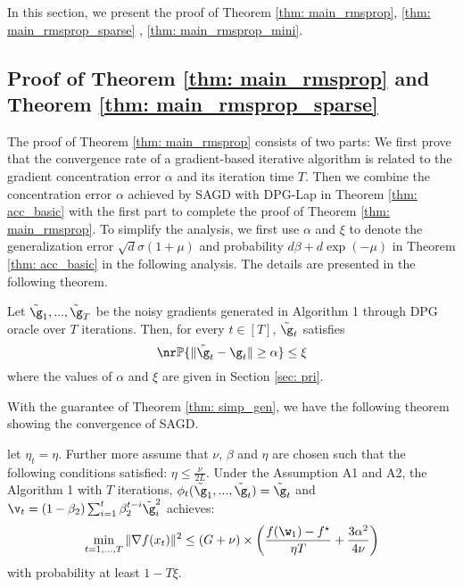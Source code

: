 
In this section, we present the proof of Theorem \ref{thm: main_rmsprop}, \ref{thm: main_rmsprop_sparse}
\label{sec: thm2_proof}, \ref{thm: main_rmsprop_mini}.

\subsection{Proof of Theorem \ref{thm: main_rmsprop} and Theorem \ref{thm: main_rmsprop_sparse}}

\theomainrmsprop*

The proof of Theorem \ref{thm: main_rmsprop} consists of two parts: We first prove that the convergence rate of a gradient-based iterative algorithm is related to the gradient concentration error $\alpha$ and its iteration 
time $T$. Then we combine the concentration error $\alpha$ achieved by SAGD with DPG-Lap in Theorem \ref{thm: acc_basic} with the first part to complete the proof of Theorem \ref{thm: main_rmsprop}. 
To simplify the analysis, we first use $\alpha$ and $\xi$ to denote the generalization error $\sqrt{d} \sigma(1+\mu)$ and probability $d \beta+d \exp (-\mu)$ in Theorem \ref{thm: acc_basic} in the following analysis. The details are presented in the following theorem.
\begin{theo} \label{thm: simp_gen}
Let $\tilde \g_1,...,\tilde \g_T$ be the noisy gradients generated in Algorithm 1 through DPG oracle over $T$ iterations.
Then, for every $t \in [T]$, $\tilde \g_t$ satisfies
\begin{equation} \nr
    \mathbb{P}\{\|\tilde \g_t - \g_t\| \geq \alpha \} \leq \xi
\end{equation}
where the values of $\alpha$ and $\xi$ are given in Section \ref{sec: pri}. 
\end{theo}
With the guarantee of Theorem \ref{thm: simp_gen}, we have the following theorem showing the convergence of SAGD.
\begin{theo} \label{thm: opt_rmsprop}
 let $\eta_t = \eta$. Further more assume that $\nu$, $\beta$ and $\eta$ are chosen such that the following conditions satisfied: $\eta \leq \frac{\nu}{2L}$. 
 Under the Assumption A1 and A2, the Algorithm 1 with $T$ iterations, $\phi_t(\tilde \g_1,...,\tilde \g_t) = \tilde \g_t$ and $ \v_t = \left(1-\beta_{2}\right) \sum_{i=1}^{t} \beta_{2}^{t-i} \tilde \g_{i}^{2}$ achieves:
\begin{equation}\label{eq: opt_rmsprop}
 \min_{t = 1,..., T}\|\nabla f(x_t)\|^2 \leq
    \left(G+\nu \right) \times \left(   \frac{ f(\w_1) - f^\star}{\eta T} + \frac{3 \alpha^2}{4\nu}\right)
\end{equation}
with probability at least $1-T\xi$.
\end{theo}
